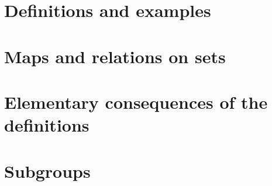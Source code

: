 

\newcommand{\get}[1]{\section{#1}}



\get{Definitions and examples}
\get{Maps and relations on sets}
\get{Elementary consequences of the definitions}
\get{Subgroups}


